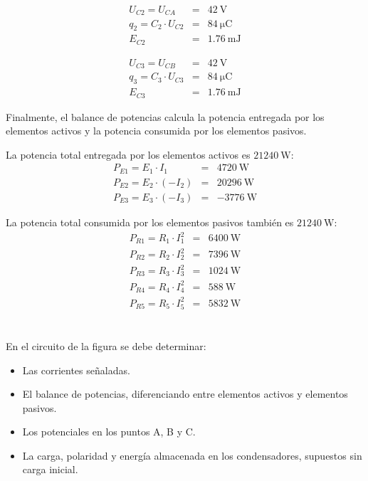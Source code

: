 \documentclass[10pt]{article}
\begin{document}
\begin{eqnarray*}
U_{C2} = U_{CA} & = & \SI{42}{\volt}\\
q_2 = C_2 \cdot U_{C2} & = & \SI{84}{\micro\coulomb}\\
E_{C2} & = & \SI{1.76}{\milli\joule}
\end{eqnarray*}

\begin{eqnarray*}
U_{C3} = U_{CB} & = & \SI{42}{\volt}\\
q_3 = C_3 \cdot U_{C3} & = & \SI{84}{\micro\coulomb}\\
E_{C3} & = & \SI{1.76}{\milli\joule}
\end{eqnarray*}

Finalmente, el balance de potencias calcula la potencia entregada por los elementos activos y la potencia consumida por los elementos pasivos.

La potencia total entregada por los elementos activos es $\SI{21240}{\watt}$:
\begin{eqnarray*}
P_{E1} = E_1 \cdot I_1 & = & \SI{4720}{\watt}\\
P_{E2} = E_2 \cdot (-I_2) & = & \SI{20296}{\watt}\\
P_{E3} = E_3 \cdot (-I_3) & = & \SI{-3776}{\watt}
\end{eqnarray*}

La potencia total consumida por los elementos pasivos también es $\SI{21240}{\watt}$:
\begin{eqnarray*}
P_{R1} = R_1 \cdot I_1^2 & = & \SI{6400}{\watt}\\
P_{R2} = R_2 \cdot I_2^2 & = & \SI{7396}{\watt}\\
P_{R3} = R_3 \cdot I_3^2 & = & \SI{1024}{\watt}\\
P_{R4} = R_4 \cdot I_4^2 & = & \SI{588}{\watt}\\
P_{R5} = R_5 \cdot I_5^2 & = & \SI{5832}{\watt}
\end{eqnarray*}

\clearpage

\section{}

En el circuito de la figura se debe determinar:
\begin{itemize}
\item Las corrientes señaladas.
\item El balance de potencias, diferenciando entre elementos activos y elementos pasivos.
\item Los potenciales en los puntos A, B y C.
\item La carga, polaridad y energía almacenada en los condensadores, supuestos sin carga inicial.
\end{itemize}
\end{document}
